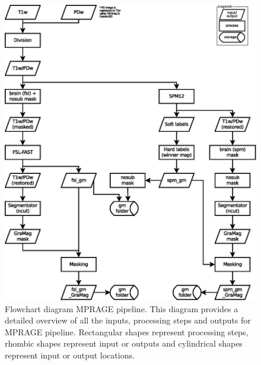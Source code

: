 \begin{figure}[htbp!]
\centering
\includegraphics[width=\textwidth]{figures/chapter_02_SI/figure_S5.eps}
\caption{Flowchart diagram MPRAGE pipeline. This diagram provides a detailed overview of all the inputs, processing steps and outputs for MPRAGE pipeline. Rectangular shapes represent processing steps, rhombic shapes represent input or outputs and cylindrical shapes represent input or output locations.}
\label{fig:S5_Fig}
\end{figure}

